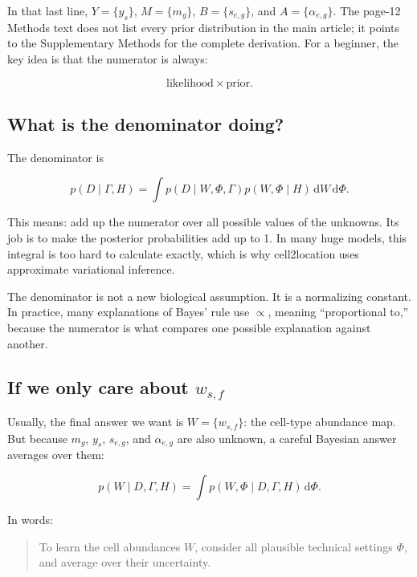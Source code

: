 \documentclass[11pt]{article}
\newcommand{\dd}{\mathrm{d}}
\begin{document}
In that last line, \(Y=\{y_s\}\), \(M=\{m_g\}\), \(B=\{s_{e,g}\}\), and \(A=\{\alpha_{e,g}\}\). The page-12 Methods text does not list every prior distribution in the main article; it points to the Supplementary Methods for the complete derivation. For a beginner, the key idea is that the numerator is always:

\[
\text{likelihood} \times \text{prior}.
\]

\subsection{What is the denominator doing?}

The denominator is

\begin{mathbox}
\[
p(D\mid \Gamma,H)
=
\int p(D\mid W,\Phi,\Gamma)p(W,\Phi\mid H)\,\dd W\,\dd\Phi.
\]
\end{mathbox}

This means: add up the numerator over all possible values of the unknowns. Its job is to make the posterior probabilities add up to 1. In many huge models, this integral is too hard to calculate exactly, which is why cell2location uses approximate variational inference.

\begin{warningbox}
The denominator is not a new biological assumption. It is a normalizing constant. In practice, many explanations of Bayes' rule use \(\propto\), meaning ``proportional to,'' because the numerator is what compares one possible explanation against another.
\end{warningbox}

\subsection{If we only care about \texorpdfstring{$w_{s,f}$}{w_sf}}

Usually, the final answer we want is \(W=\{w_{s,f}\}\): the cell-type abundance map. But because \(m_g\), \(y_s\), \(s_{e,g}\), and \(\alpha_{e,g}\) are also unknown, a careful Bayesian answer averages over them:

\begin{mathbox}
\[
p(W\mid D,\Gamma,H)
=
\int p(W,\Phi\mid D,\Gamma,H)\,\dd\Phi.
\]
\end{mathbox}

In words:

\begin{quote}
To learn the cell abundances \(W\), consider all plausible technical settings \(\Phi\), and average over their uncertainty.
\end{quote}
\end{document}
